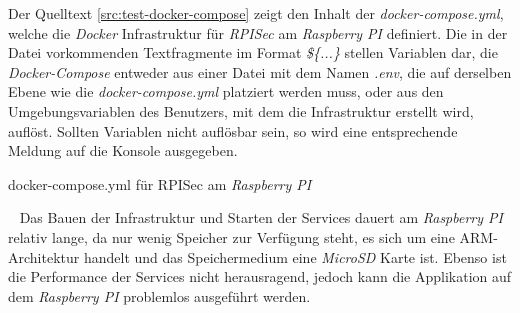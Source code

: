 \newline
\newline
Der Quelltext \ref{src:test-docker-compose} zeigt den Inhalt der \emph{docker-compose.yml}, welche die \emph{Docker} Infrastruktur für \emph{RPISec} am \emph{Raspberry PI} definiert. Die in der Datei vorkommenden Textfragmente im Format \emph{\$\{...\}} stellen Variablen dar, die \emph{Docker-Compose} entweder aus einer Datei mit dem Namen \emph{.env}, die auf derselben Ebene wie die \emph{docker-compose.yml} platziert werden muss, oder aus den Umgebungsvariablen des Benutzers, mit dem die Infrastruktur erstellt wird, auflöst. Sollten Variablen nicht auflösbar sein, so wird eine entsprechende Meldung auf die Konsole ausgegeben.
\begin{code}
	\caption{docker-compose.yml für RPISec am \emph{Raspberry PI}}
	\label{src:test-docker-compose}
\end{code}
\ \newline
Das Bauen der Infrastruktur und Starten der Services dauert am \emph{Raspberry PI} relativ lange, da nur wenig Speicher zur Verfügung steht, es sich um eine ARM-Architektur handelt und das Speichermedium eine \emph{MicroSD} Karte ist. Ebenso ist die Performance der Services nicht herausragend, jedoch kann die Applikation auf dem \emph{Raspberry PI} problemlos ausgeführt werden.  